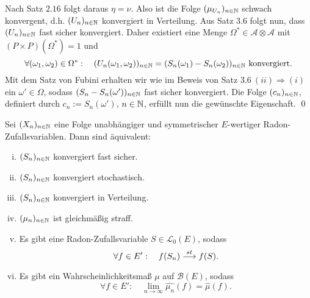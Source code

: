 \begin{proof*}
$$    $$
    Nach Satz $2.16$ folgt daraus $\eta = \nu$. Also ist die Folge $(\mu_{U_n})_{n \in \mathbb{N}}$ schwach konvergent, d.h. $(U_n)_{n \in \mathbb{N}}$ konvergiert in Verteilung. 
    Aus Satz $3.6$ folgt nun, dass $(U_n)_{n \in \mathbb{N}}$ fast sicher konvergiert. 
    Daher existiert eine Menge $\Omega^* \in \mathcal{A} \otimes \mathcal{A}$ mit $(P\times P)(\Omega^*) = 1$ und 
    $$
        \forall (\omega_1, \omega_2) \in \Omega^*: \quad (U_n(\omega_1, \omega_2))_{n \in \mathbb{N}} = (S_n(\omega_1) - S_n(\omega_2))_{n \in \mathbb{N}} \text{ konvergiert.}
    $$
    Mit dem Satz von Fubini erhalten wir wie im Beweis von Satz $3.6 \ (ii) \Rightarrow (i)$ ein $\omega' \in \Omega$, sodass \mbox{$(S_n - S_n(\omega'))_{n \in \mathbb{N}}$} fast sicher konvergiert. 
    Die Folge $(c_n)_{n \in \mathbb{N}}$, definiert durch $c_n := S_n(\omega')$, $n \in \mathbb{N}$, erfüllt nun die gewünschte Eigenschaft. \qed

\end{proof*}

\begin{theorem}
    Sei $(X_n)_{n \in \mathbb{N}}$ eine Folge unabhängiger und symmetrischer $E$-wertiger Radon-Zufallsvariablen. Dann sind äquivalent:
    \begin{enumerate}[(i)]
        \item $(S_n)_{n \in \mathbb{N}}$ konvergiert fast sicher.
        \item $(S_n)_{n \in \mathbb{N}}$ konvergiert stochastisch. 
        \item $(S_n)_{n \in \mathbb{N}}$ konvergiert in Verteilung. 
        \item $(\mu_n)_{n \in \mathbb{N}}$ ist gleichmäßig straff.
        \item Es gibt eine Radon-Zufallsvariable $S \in \mathcal{L}_0(E)$, sodass 
        $$
            \forall f \in E': \quad f(S_n) \overset{st}{\longrightarrow} f(S).
        $$
        \item Es gibt ein Wahrscheinlichkeitsmaß $\mu$ auf $\mathcal{B}(E)$, sodass 
        $$
            \forall f \in E': \quad \lim_{n \to \infty}\widehat{\mu_n}(f) = \widehat{\mu}(f). 
        $$
    \end{enumerate}
\end{theorem}

